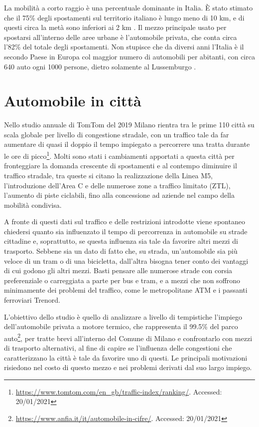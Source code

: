 La mobilità a corto raggio è una percentuale dominante in Italia. È stato stimato che il 75\% degli spostamenti sul territorio italiano è lungo meno di 10 km, e di questi circa la metà sono inferiori ai 2 km \cite{isfortaudimob}. Il mezzo principale usato per spostarsi all'interno delle aree urbane è l'automobile privata, che conta circa l'82\% del totale degli spostamenti. Non stupisce che da diversi anni l'Italia è il secondo Paese in Europa col maggior numero di automobili per abitanti, con circa 640 auto ogni 1000 persone, dietro solamente al Lussemburgo \cite{eurostatcars}.

\section{Automobile in città}

Nello studio annuale di TomTom del 2019 Milano rientra tra le prime 110 città su scala globale per livello di congestione stradale, con un traffico tale da far aumentare di quasi il doppio il tempo impiegato a percorrere una tratta durante le ore di picco\footnote{\url{https://www.tomtom.com/en_gb/traffic-index/ranking/}. Accessed: 20/01/2021}. Molti sono stati i cambiamenti apportati a questa città per fronteggiare la domanda crescente di spostamenti e al contempo diminuire il traffico stradale, tra queste si citano la realizzazione della Linea M5, l'introduzione dell'Area C e delle numerose zone a traffico limitato (ZTL), l'aumento di piste ciclabili, fino alla concessione ad aziende nel campo della mobilità condivisa.

A fronte di questi dati sul traffico e delle restrizioni introdotte viene spontaneo chiedersi quanto sia influenzato il tempo di percorrenza in automobile su strade cittadine e, soprattutto, se questa influenza sia tale da favorire altri mezzi di trasporto. Sebbene sia un dato di fatto che, su strada, un'automobile sia più veloce di un tram o di una bicicletta, dall'altra bisogna tener conto dei vantaggi di cui godono gli altri mezzi. Basti pensare alle numerose strade con corsia preferenziale o carreggiata a parte per bus e tram, e a mezzi che non soffrono minimamente dei problemi del traffico, come le metropolitane ATM e i passanti ferroviari Trenord.

L'obiettivo dello studio è quello di analizzare a livello di tempistiche l'impiego dell'automobile privata a motore termico, che rappresenta il 99.5\% del parco auto\footnote{\label{footanfia}\url{https://www.anfia.it/it/automobile-in-cifre/}. Accessed: 20/01/2021}, per tratte brevi all'interno del Comune di Milano e confrontarlo con mezzi di trasporto alternativi, al fine di capire se l'influenza delle congestioni che caratterizzano la città è tale da favorire uno di questi. Le principali motivazioni risiedono nel costo di questo mezzo e nei problemi derivati dal suo largo impiego.

